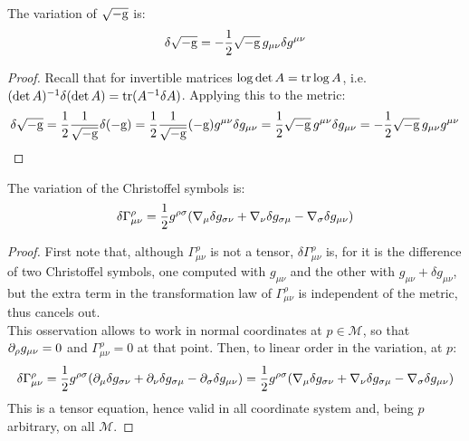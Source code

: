 \begin{lemma}\label{lemma-sqgm}
  The variation of $ \sqrt{-\mathrm{g}} $ is:
  \begin{equation}
    \delta \sqrt{-\mathrm{g}} = - \frac{1}{2} \sqrt{-\mathrm{g}}\, g_{\mu \nu} \delta g^{\mu \nu}
    \label{eq:4.2}
  \end{equation}
\end{lemma}
\begin{proof}
  Recall that for invertible matrices $ \log \det A = \operatorname{tr} \log A $, i.e. $ (\det A)^{-1} \delta (\det A) = \operatorname{tr} (A^{-1} \delta A) $. Applying this to the metric:
  \begin{equation*}
    \delta \sqrt{-\mathrm{g}} = \frac{1}{2} \frac{1}{\sqrt{-\mathrm{g}}} \delta (-\mathrm{g}) = \frac{1}{2} \frac{1}{\sqrt{-\mathrm{g}}} (-\mathrm{g}) g^{\mu \nu} \delta g_{\mu \nu} = \frac{1}{2} \sqrt{-\mathrm{g}}\, g^{\mu \nu} \delta g_{\mu \nu} = - \frac{1}{2} \sqrt{-\mathrm{g}}\, g_{\mu \nu} g^{\mu \nu}
  \end{equation*}
\end{proof}

\begin{lemma}
  The variation of the Christoffel symbols is:
  \begin{equation}
    \delta \Gamma^\rho_{\mu \nu} = \frac{1}{2} g^{\rho \sigma} ( \nabla_\mu \delta g_{\sigma \nu} + \nabla_\nu \delta g_{\sigma \mu} - \nabla_\sigma \delta g_{\mu \nu} )
    \label{eq:4.3}
  \end{equation}
\end{lemma}
\begin{proof}
  First note that, although $ \Gamma^\rho_{\mu \nu} $ is not a tensor, $ \delta \Gamma^\rho_{\mu \nu} $ is, for it is the difference of two Christoffel symbols, one computed with $ g_{\mu \nu} $ and the other with $ g_{\mu \nu} + \delta g_{\mu \nu} $, but the extra term in the transformation law of $ \Gamma^\rho_{\mu \nu} $ is independent of the metric, thus cancels out.\\
  This osservation allows to work in normal coordinates at $ p \in \mathcal{M} $, so that $ \partial_\rho g_{\mu \nu} = 0 $ and $ \Gamma^\rho_{\mu \nu} = 0 $ at that point. Then, to linear order in the variation, at $ p $:
  \begin{equation*}
    \delta \Gamma^\rho_{\mu \nu} = \frac{1}{2} g^{\rho \sigma} ( \partial_\mu \delta g_{\sigma \nu} + \partial_\nu \delta g_{\sigma \mu} - \partial_\sigma \delta g_{\mu \nu} ) = \frac{1}{2} g^{\rho \sigma} ( \nabla_\mu \delta g_{\sigma \nu} + \nabla_\nu \delta g_{\sigma \mu} - \nabla_\sigma \delta g_{\mu \nu} )
  \end{equation*}
  This is a tensor equation, hence valid in all coordinate system and, being $ p $ arbitrary, on all $ \mathcal{M} $.
\end{proof}

